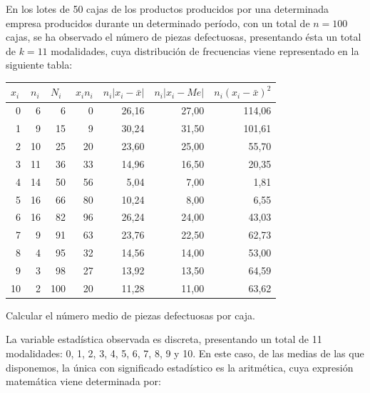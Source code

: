 En los lotes de 50 cajas de los productos producidos por una determinada empresa producidos durante un determinado período, con un total de $n = 100$ cajas, se ha observado el número de piezas defectuosas, presentando ésta un total de $k = 11$ modalidades, cuya distribución de frecuencias viene representado en la siguiente tabla:
\begin{center}
	\begin{table}[htbp]
		\begin{center}
			\begin{tabular}{|r|r|r|r|r|r|r|}
				\hline
				\multicolumn{1}{|l|}{$x_{i}$} & \multicolumn{1}{l|}{$n_{i}$} & \multicolumn{1}{l|}{$N_{i}$} &
				\multicolumn{1}{l|}{$x_{i}n_{i}$} & \multicolumn{1}{l|}{$n_{i}|x_{i} - \bar x|$} & \multicolumn{1}{l|}{$n_{i}|x_{i} - Me|$} & \multicolumn{1}{l|}{$n_{i}(x_{i} - \bar x)^2$} \\ \hline
				0 & 6 & 6 & 0 & 26,16 & 27,00 & 114,06 \\ \hline
				1 & 9 & 15 & 9 & 30,24 & 31,50 & 101,61 \\ \hline
				2 & 10 & 25 & 20 & 23,60 & 25,00 & 55,70 \\ \hline
				3 & 11 & 36 & 33 & 14,96 & 16,50 & 20,35 \\ \hline
				4 & 14 & 50 & 56 & 5,04 & 7,00 & 1,81 \\ \hline
				5 & 16 & 66 & 80 & 10,24 & 8,00 & 6,55 \\ \hline
				6 & 16 & 82 & 96 & 26,24 & 24,00 & 43,03 \\ \hline
				7 & 9 & 91 & 63 & 23,76 & 22,50 & 62,73 \\ \hline
				8 & 4 & 95 & 32 & 14,56 & 14,00 & 53,00 \\ \hline
				9 & 3 & 98 & 27 & 13,92 & 13,50 & 64,59 \\ \hline
				10 & 2 & 100 & 20 & 11,28 & 11,00 & 63,62 \\ \hline
			\end{tabular}
		\end{center}
	\end{table}	
	
\end{center}

\subproblem
Calcular el n{\'u}mero medio de piezas defectuosas por caja.

La variable estadística observada es discreta, presentando un total de 11 modalidades: 0, 1, 2, 3, 4, 5, 6, 7, 8, 9 y 10. En este caso, de las medias de las que disponemos, la única con significado estadístico es la aritmética, cuya expresión matemática viene determinada por:

